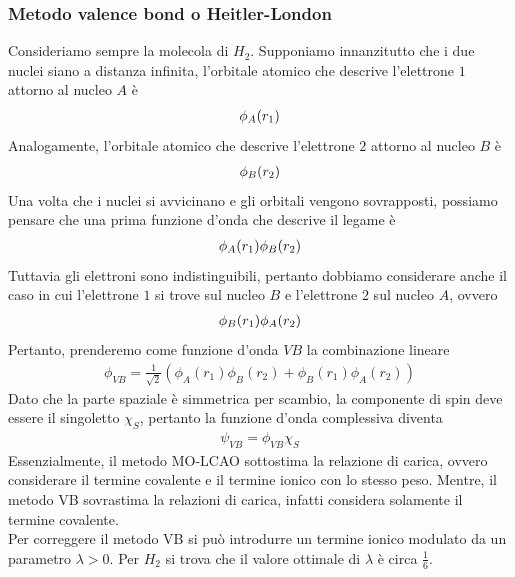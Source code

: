 \documentclass{article}
\begin{document}
\subsubsection*{Metodo valence bond o Heitler-London}
Consideriamo sempre la molecola di $H_2$. Supponiamo innanzitutto che i due nuclei siano a distanza infinita, l'orbitale atomico che descrive l'elettrone $1$ attorno al nucleo $A$ è 
\begin{align}
    \phi_A(r_1) \notag
\end{align}
Analogamente, l'orbitale atomico che descrive l'elettrone $2$ attorno al nucleo $B$ è 
\begin{align}
    \phi_B(r_2) \notag
\end{align}
Una volta che i nuclei si avvicinano e gli orbitali vengono sovrapposti, possiamo pensare che una prima funzione d'onda che descrive il legame è 
\begin{align}
    \phi_A(r_1)\phi_B(r_2) \notag
\end{align}
Tuttavia gli elettroni sono indistinguibili, pertanto dobbiamo considerare anche il caso in cui l'elettrone $1$ si trove sul nucleo $B$ e l'elettrone $2$ sul nucleo $A$, ovvero 
\begin{align}
    \phi_B(r_1)\phi_A(r_2) \notag
\end{align}
Pertanto, prenderemo come funzione d'onda $VB$ la combinazione lineare 
\begin{align}
    \phi_{VB} = \frac{1}{\sqrt{2}}(\phi_A(r_1)\phi_B(r_2) + \phi_B(r_1)\phi_A(r_2)) \tag{3.3.10}
\end{align}
Dato che la parte spaziale è simmetrica per scambio, la componente di spin deve essere il singoletto $\chi_S$, pertanto la funzione d'onda complessiva diventa 
\begin{align}
    \psi_{VB} = \phi_{VB}\chi_S \tag{3.3.11}
\end{align}
Essenzialmente, il metodo MO-LCAO sottostima la relazione di carica, ovvero considerare il termine covalente e il termine ionico con lo stesso peso. Mentre, il metodo VB sovrastima la relazioni di carica, infatti considera solamente il termine covalente. \\
Per correggere il metodo VB si può introdurre un termine ionico modulato da un parametro $\lambda > 0$. Per $H_2$ si trova che il valore ottimale di $\lambda$ è circa $\frac{1}{6}$.

\newpage
\end{document}
